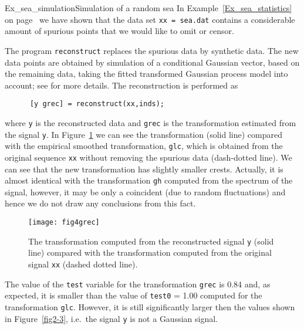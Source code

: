 \begin{rtex}{Ex_sea_simulation}{Simulation of a random sea}
In Example~\ref{Ex_sea_statistics} on page~\pageref{page:spurious}
we have shown that the
data set {\tt xx = sea.dat} contains a considerable amount of
spurious points that we would like to omit or censor.

The program \verb+reconstruct+
replaces the spurious data by
synthetic data. The new data points are obtained by simulation of 
a conditional Gaussian vector, based on the remaining data, taking the 
fitted transformed Gaussian process model into account; 
see
\cite{BrodtkorbEtal1999Joint,BrodtkorbEtal2001Joint} for more details.
The reconstruction is performed as
{\small\begin{verbatim}
      [y grec] = reconstruct(xx,inds);
\end{verbatim}}
\noindent
where {\tt y} is the reconstructed data and {\tt grec} is the transformation
estimated from the signal {\tt y}. In Figure~\ref{fig4-11} we can see the
transformation (solid line) compared with the empirical
smoothed transformation,
{\tt glc}, which is obtained from the
original sequence {\tt xx} without removing the spurious data
(dash-dotted line).  We can see that the new transformation
has slightly smaller
crests. Actually, it is almost identical with the transformation
{\tt gh} computed from the spectrum of the signal, however, it
may be only a coincident (due to random fluctuations)
and hence we do not draw any conclusions from this fact.

\begin{figure}
\centering
    \texttt{[image: fig4grec]}
\vspace{-3mm}
\caption[Transformation computed from reconstructed signal]{
The transformation computed from the reconstructed signal
{\tt y} (solid line) compared with
the transformation computed from the original signal {\tt xx}
(dashed dotted line).
}
\label{fig4-11}
\end{figure}

The value of the {\tt test} variable for the transformation
{\tt grec} is 0.84 and, as
expected, it is smaller than the value of {\tt test0} = 1.00 computed for the
transformation {\tt glc}. However, it is still significantly larger then the
values shown in Figure~\ref{fig2-3}, i.e.\ the signal {\tt y} is not
a Gaussian signal.


\end{rtex}
